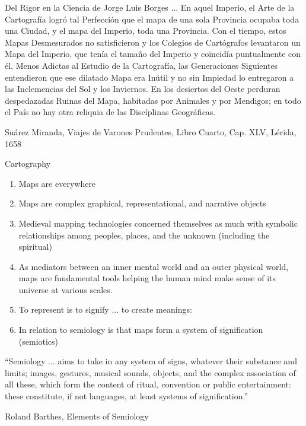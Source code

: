 \documentclass{beamer}
\begin{document}
\begin{frame}{Del Rigor en la Ciencia de Jorge Luis Borges}
	... En aquel Imperio, el Arte de la Cartograf\'ia logr\'o tal Perfecci\'on que el mapa de una sola
	Provincia ocupaba toda una Ciudad, y el mapa del Imperio, toda una Provincia. Con el
	tiempo, estos Mapas Desmesurados no satisficieron y los Colegios de Cart\'ografos levantaron
	un Mapa del Imperio, que ten\'ia el tama\~no del Imperio y coincid\'ia puntualmente con \'el.
	Menos Adictas al Estudio de la Cartograf\'ia, las Generaciones Siguientes entendieron que ese
	dilatado Mapa era In\'util y no sin Impiedad lo entregaron a las Inclemencias del Sol y los
	Inviernos. En los desiertos del Oeste perduran despedazadas Ruinas del Mapa, habitadas por
	Animales y por Mendigos; en todo el Pa\'is no hay otra reliquia de las Disc\'iplinas Geogr\'aficas.\par

	\hfill Su\'arez Miranda, Viajes de Varones Prudentes, Libro Cuarto, Cap. XLV, L\'erida, 1658\par

\end{frame}
\begin{frame}{Cartography}
	\begin{enumerate}
		\item Maps are everywhere
		\item Maps are complex graphical, representational, and narrative objects

		\item Medieval  mapping technologies concerned themselves as much with symbolic relationships among peoples, places, and the unknown (including the spiritual)

		\item As mediators between an inner mental world and an outer physical world, maps are fundamental tools helping the human mind make sense of its universe at various scales.

		\item To represent is to signify ... to create meanings:
		\item In relation to semiology is that maps form a system of signification (semiotics)
	\end{enumerate}
\end{frame}
\begin{frame}
	``Semiology ... aims to take in any system of signs, whatever their substance and limits; images, gestures, musical sounds, objects, and the complex association of all these, which form the content of ritual, convention or public entertainment: these constitute, if not languages, at least systems of signification.''\par
	\hfill Roland Barthes, Elements of Semiology\par
\end{frame}
\end{document}
